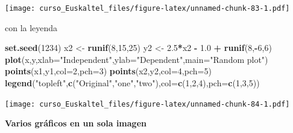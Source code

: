 \documentclass[]{book}
\newenvironment{Shaded}{\begin{snugshade}}{\end{snugshade}}
\newcommand{\KeywordTok}[1]{\textcolor[rgb]{0.13,0.29,0.53}{\textbf{#1}}}
\newcommand{\DataTypeTok}[1]{\textcolor[rgb]{0.13,0.29,0.53}{#1}}
\newcommand{\DecValTok}[1]{\textcolor[rgb]{0.00,0.00,0.81}{#1}}
\newcommand{\FloatTok}[1]{\textcolor[rgb]{0.00,0.00,0.81}{#1}}
\newcommand{\StringTok}[1]{\textcolor[rgb]{0.31,0.60,0.02}{#1}}
\newcommand{\OperatorTok}[1]{\textcolor[rgb]{0.81,0.36,0.00}{\textbf{#1}}}
\newcommand{\NormalTok}[1]{#1}
\begin{document}
\texttt{[image: curso\_Euskaltel\_files/figure-latex/unnamed-chunk-83-1.pdf]}

con la leyenda

\begin{Shaded}
\begin{Highlighting}[]
\KeywordTok{set.seed}\NormalTok{(}\DecValTok{1234}\NormalTok{)}
\NormalTok{x2 <-}\StringTok{ }\KeywordTok{runif}\NormalTok{(}\DecValTok{8}\NormalTok{,}\DecValTok{15}\NormalTok{,}\DecValTok{25}\NormalTok{)}
\NormalTok{y2 <-}\StringTok{ }\FloatTok{2.5}\OperatorTok{*}\NormalTok{x2 }\OperatorTok{-}\StringTok{ }\FloatTok{1.0} \OperatorTok{+}\StringTok{ }\KeywordTok{runif}\NormalTok{(}\DecValTok{8}\NormalTok{,}\OperatorTok{-}\DecValTok{6}\NormalTok{,}\DecValTok{6}\NormalTok{)}
 \KeywordTok{plot}\NormalTok{(x,y,}\DataTypeTok{xlab=}\StringTok{"Independent"}\NormalTok{,}\DataTypeTok{ylab=}\StringTok{"Dependent"}\NormalTok{,}\DataTypeTok{main=}\StringTok{"Random plot"}\NormalTok{)}
 \KeywordTok{points}\NormalTok{(x1,y1,}\DataTypeTok{col=}\DecValTok{2}\NormalTok{,}\DataTypeTok{pch=}\DecValTok{3}\NormalTok{)}
 \KeywordTok{points}\NormalTok{(x2,y2,}\DataTypeTok{col=}\DecValTok{4}\NormalTok{,}\DataTypeTok{pch=}\DecValTok{5}\NormalTok{)}
 \KeywordTok{legend}\NormalTok{(}\StringTok{"topleft"}\NormalTok{,}\KeywordTok{c}\NormalTok{(}\StringTok{"Original"}\NormalTok{,}\StringTok{"one"}\NormalTok{,}\StringTok{"two"}\NormalTok{),}\DataTypeTok{col=}\KeywordTok{c}\NormalTok{(}\DecValTok{1}\NormalTok{,}\DecValTok{2}\NormalTok{,}\DecValTok{4}\NormalTok{),}\DataTypeTok{pch=}\KeywordTok{c}\NormalTok{(}\DecValTok{1}\NormalTok{,}\DecValTok{3}\NormalTok{,}\DecValTok{5}\NormalTok{))}
\end{Highlighting}
\end{Shaded}

\texttt{[image: curso\_Euskaltel\_files/figure-latex/unnamed-chunk-84-1.pdf]}

\textbf{Varios gráficos en un sola imagen}
\end{document}
